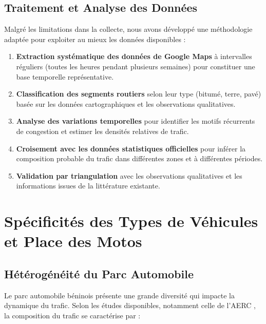 \subsection{Traitement et Analyse des Données}
\label{subsec:traitement_donnees}

Malgré les limitations dans la collecte, nous avons développé une méthodologie adaptée pour exploiter au mieux les données disponibles :

\begin{enumerate}
\item \textbf{Extraction systématique des données de Google Maps} à intervalles réguliers (toutes les heures pendant plusieurs semaines) pour constituer une base temporelle représentative.

\item \textbf{Classification des segments routiers} selon leur type (bitumé, terre, pavé) basée sur les données cartographiques et les observations qualitatives.

\item \textbf{Analyse des variations temporelles} pour identifier les motifs récurrents de congestion et estimer les densités relatives de trafic.

\item \textbf{Croisement avec les données statistiques officielles} pour inférer la composition probable du trafic dans différentes zones et à différentes périodes.

\item \textbf{Validation par triangulation} avec les observations qualitatives et les informations issues de la littérature existante.
\end{enumerate}

\section{Spécificités des Types de Véhicules et Place des Motos}
\label{sec:specificites_vehicules}

\subsection{Hétérogénéité du Parc Automobile}
\label{subsec:heterogeneite_parc}

Le parc automobile béninois présente une grande diversité qui impacte la dynamique du trafic. Selon les études disponibles, notamment celle de l'AERC \cite{aerc2019taxi}, la composition du trafic se caractérise par :


